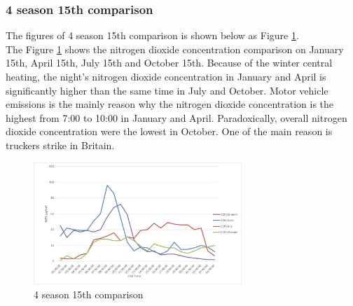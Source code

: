 \documentclass[a4paper,12pt,reqno]{article}
\begin{document}
    \subsubsection*{4 season 15th comparison}
        The figures of 4 season 15th comparison is shown below 
        as Figure \ref{fig:4_season_15th_comparison}.\\
        The Figure \ref{fig:4_season_15th_comparison} shows the nitrogen 
        dioxide concentration comparison on January 15th, April 15th, 
        July 15th and October 15th. Because of the winter central heating, 
        the night’s nitrogen dioxide concentration in January and April 
        is significantly higher than the same time in July and October. 
        Motor vehicle emissions is the mainly reason why the nitrogen 
        dioxide concentration is the highest from 7:00 to 10:00 in January 
        and April. Paradoxically, overall nitrogen dioxide concentration 
        were the lowest in October. One of the main reason is truckers 
        strike in Britain.
        \begin{figure}[H]
            \centering
            \includegraphics[width=0.7\textwidth]{figures/figure2.png}
            \caption{4 season 15th comparison}
            \label{fig:4_season_15th_comparison}
        \end{figure}
        

\newpage



\end{document}
